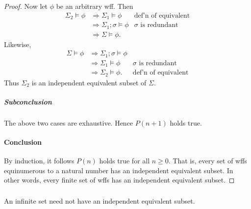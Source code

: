 \documentclass{report}
\begin{document}
\begin{proof}
        Now let $\phi$ be an arbitrary wff.
        Then
          \begin{align*}
            \Sigma_2 \vDash \phi
              & \Rightarrow \Sigma_1 \vDash \phi
                & \text{def'n of equivalent} \\
              & \Rightarrow \Sigma_1; \sigma \vDash \phi
                & \sigma \text{ is redundant} \\
              & \Rightarrow \Sigma \vDash \phi.
          \end{align*}
        Likewise,
          \begin{align*}
            \Sigma \vDash \phi
              & \Rightarrow \Sigma_1; \sigma \vDash \phi \\
              & \Rightarrow \Sigma_1 \vDash \phi
                & \sigma \text{ is redundant} \\
              & \Rightarrow \Sigma_2 \vDash \phi.
                & \text{def'n of equivalent}
          \end{align*}
        Thus $\Sigma_2$ is an independent equivalent subset of $\Sigma$.

      \subparagraph{Subconclusion}%

        The above two cases are exhaustive.
        Hence $P(n + 1)$ holds true.

    \paragraph{Conclusion}%

      By induction, it follows $P(n)$ holds true for all $n \geq 0$.
      That is, every set of wffs equinumerous to a natural number has an
        independent equivalent subset.
      In other words, every finite set of wffs has an independent equivalent
        subset.

  \end{proof}

\subsubsection{}%

  An infinite set need not have an independent equivalent subset.
\end{document}
